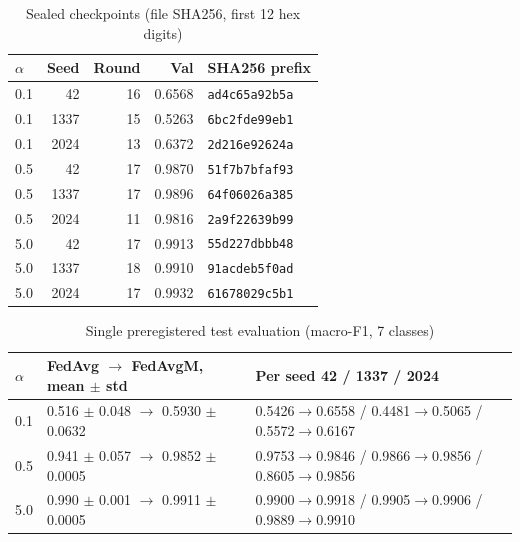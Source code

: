 \begin{table}[h]
\centering
\caption{Sealed checkpoints (file SHA256, first 12 hex digits)} %
\label{tab:sealed}
\footnotesize
\setlength{\tabcolsep}{3pt}
\begin{tabular}{@{}lrrrl@{}}
\toprule
$\alpha$ & Seed & Round & Val & SHA256 prefix\\
\midrule
0.1 & 42 & 16 & 0.6568 & \texttt{ad4c65a92b5a}\\ %
0.1 & 1337 & 15 & 0.5263 & \texttt{6bc2fde99eb1}\\ %
0.1 & 2024 & 13 & 0.6372 & \texttt{2d216e92624a}\\ %
0.5 & 42 & 17 & 0.9870 & \texttt{51f7b7bfaf93}\\ %
0.5 & 1337 & 17 & 0.9896 & \texttt{64f06026a385}\\ %
0.5 & 2024 & 11 & 0.9816 & \texttt{2a9f22639b99}\\ %
5.0 & 42 & 17 & 0.9913 & \texttt{55d227dbbb48}\\ %
5.0 & 1337 & 18 & 0.9910 & \texttt{91acdeb5f0ad}\\ %
5.0 & 2024 & 17 & 0.9932 & \texttt{61678029c5b1}\\ %
\bottomrule
\end{tabular}
\end{table}

\begin{table}[t]
\centering
\caption{Single preregistered test evaluation (macro-F1, 7 classes)} %
\label{tab:prereg_test}
\footnotesize
\setlength{\tabcolsep}{3pt}
\begin{tabular}{@{}lll@{}}
\toprule
$\alpha$ & FedAvg $\to$ FedAvgM, mean $\pm$ std & Per seed 42 / 1337 / 2024\\ %
\midrule
0.1 & 0.516 $\pm$ 0.048 $\to$ 0.5930 $\pm$ 0.0632 & 0.5426$\to$0.6558 / 0.4481$\to$0.5065 / 0.5572$\to$0.6167\\ %
0.5 & 0.941 $\pm$ 0.057 $\to$ 0.9852 $\pm$ 0.0005 & 0.9753$\to$0.9846 / 0.9866$\to$0.9856 / 0.8605$\to$0.9856\\ %
5.0 & 0.990 $\pm$ 0.001 $\to$ 0.9911 $\pm$ 0.0005 & 0.9900$\to$0.9918 / 0.9905$\to$0.9906 / 0.9889$\to$0.9910\\ %
\bottomrule
\end{tabular}
\end{table}

